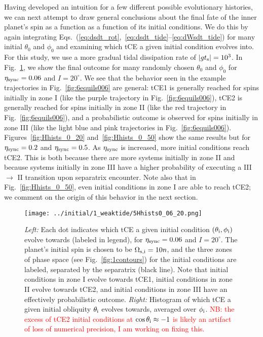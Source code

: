\documentclass[
        fleqn,
        usenatbib,
    ]{mnras}
\newcommand*{\abs}[1]{\left|#1\right|}
\begin{document}
Having developed an intuition for a few different possible evolutionary
histories, we can next attempt to draw general conclusions about the final fate
of the inner planet's spin as a function as a function of its initial
conditions. We do this by again integrating
Eqs.~(\ref{eq:dsdt_rot},~\ref{eq:dsdt_tide}--\ref{eq:dWsdt_tide}) for many
initial $\theta_0$ and $\phi_0$ and examining which tCE a given initial
condition evolves into. For this study, we use a more gradual tidal dissipation
rate of $\abs{gt_{\rm s}} = 10^3$. In Fig.~\ref{fig:Hhists_0_06}, we show the
final outcome for many randomly chosen $\theta_0$ and $\phi_0$ for $\eta_{\rm
sync} = 0.06$ and $I = 20^\circ$. We see that the behavior seen in the example
trajectories in Fig.~\ref{fig:6equils006} are general: tCE1 is generally reached
for spins initially in zone I (like the purple trajectory in
Fig.~\ref{fig:6equils006}), tCE2 is generally reached for spins initially in
zone II (like the red trajectory in Fig.~\ref{fig:6equils006}), and a
probabilistic outcome is observed for spins initially in zone III (like the
light blue and pink trajectories in Fig.~\ref{fig:6equils006}).
Figures~\ref{fig:Hhists_0_20} and~\ref{fig:Hhists_0_50} show the same results
but for $\eta_{\rm sync} = 0.2$ and $\eta_{\rm sync} = 0.5$. As $\eta_{\rm
sync}$ is increased, more initial conditions reach tCE2. This is both because
there are more systems initially in zone II and because systems initially in
zone III have a higher probability of executing a III $\to$ II transition upon
separatrix encounter. Note also that in Fig.~\ref{fig:Hhists_0_50}, even initial
conditions in zone I are able to reach tCE2; we comment on the origin of this
behavior in the next section.
\begin{figure}
    \centering
    \texttt{[image: ../initial/1\_weaktide/5Hhists0\_06\_20.png]}
    \caption{\emph{Left:} Each dot indicates which tCE a given initial condition
    $(\theta_{\rm i}, \phi_{\rm i})$ evolve towards (labeled in legend), for
    $\eta_{\rm sync} = 0.06$ and $I = 20^\circ$. The planet's initial spin is
    chosen to be $\Omega_{\rm s, i} = 10n$, and the three zones of phase space
    (see Fig.~\ref{fig:1contours}) for the initial conditions are labeled,
    separated by the separatrix (black line). Note that initial conditions in
    zone I evolve towards tCE1, initial conditions in zone II evolve towards
    tCE2, and initial conditions in zone III have an effectively probabilistic
    outcome. \emph{Right:} Histogram of which tCE a given initial obliquity
    $\theta_{\rm i}$ evolves towards, averaged over $\phi_{\rm
    i}$.
    \textcolor{red}{NB\@: the excess of tCE2 initial conditions at $\cos
    \theta_{\rm i} \approx -1$ is likely an artifact of loss of numerical
    precision, I am working on fixing this.}
    }\label{fig:Hhists_0_06}
\end{figure}
\end{document}
